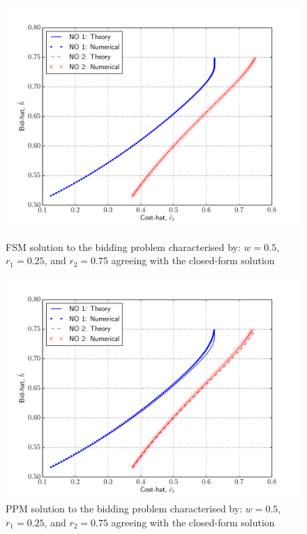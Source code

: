 \begin{figure}[p!]
  \includegraphics[width=\figsize]{Indirect/Figures/forward_shooting_verification}
  \caption{FSM solution to the bidding problem characterised by: $w=0.5$, $r_1 = 0.25$, and $r_2 = 0.75$ agreeing with the closed-form solution}
  \label{fig:forward_shooting_verification_indirect}
  \vspace{10mm}
  \includegraphics[width=\figsize]{Indirect/Figures/polynomial_projection_verification}
  \caption{PPM solution to the bidding problem characterised by: $w=0.5$, $r_1 = 0.25$, and $r_2 = 0.75$ agreeing with the closed-form solution}
  \label{fig:polynomial_projection_verification_indirect}
\end{figure}

